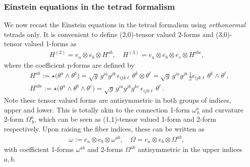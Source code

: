 \documentclass[../geometry_main.tex]{subfiles}
\begin{document}
\subsubsection{Einstein equations in the tetrad formalism}\label{sec:einstein_eq_tetrad_formalism}
%
We now recast the Einstein equations in the tetrad formalism using \emph{orthonormal} tetrads only.
It is convenient to define (2,0)-tensor valued 2-forms and (3,0)-tensor valued 1-forms as
\begin{align}
    H^{(2)}= e_a\otimes e_b \otimes H^{ab},\quad H^{(3)} = e_a\otimes  e_b \otimes e_c \otimes H^{abc},
\end{align}
where the coefficient p-forms are defined by
\begin{align}
    &H^{ab} := \star\Big(\theta^a \wedge \theta^b\Big) = \sqrt{g}\, g^{ia} g^{jb}\, \epsilon_{ijk\ell}\, \theta^k \otimes \theta^\ell = \sqrt{g}\, g^{ia} g^{jb}\, \tfrac12 \epsilon_{ijk\ell}\, \theta^k \wedge \theta^\ell,\\[3pt]
    &H^{abc} := \star\Big(\theta^a \wedge \theta^b \wedge \theta^c\Big) = \sqrt{g}\, g^{ia} g^{jb} g^{kc}\, \epsilon_{ijk\ell}\,\theta^\ell\,.
\end{align}
Note these tensor valued forms are antisymmetric in both groups of indices, upper and lower.
This is totally akin to the connection 1-form $\omega^a_{\, b}$ and curvature 2-form $\Omega^a_{\, b}$, which can be seen as (1,1)-tensor valued 1-form and 2-form respectively.
Upon raising the fiber indices, these can be written as
\begin{align}
    \omega:= e_a \otimes e_b \otimes \omega^{ab},\quad \Omega = e_a \otimes e_b \otimes \Omega^{ab},
\end{align}
with coefficient 1-forms $\omega^{ab}$ and 2-forms $\Omega^{ab}$ antisymmetric in the upper indices $a,b$.
\end{document}
